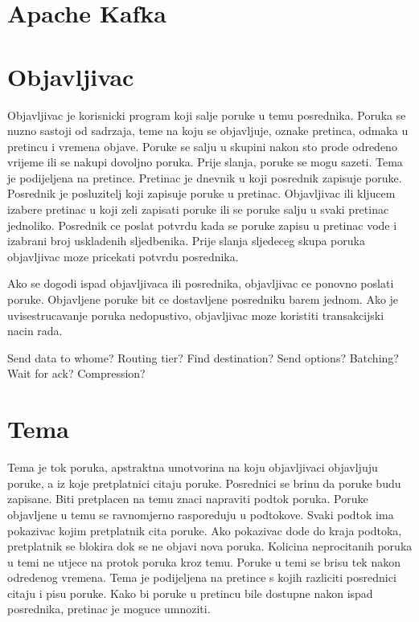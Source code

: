 \documentclass[times, utf8, diplomski, numeric]{fer}
\begin{document}
\chapter{Apache Kafka}



\chapter{Objavljivac}
Objavljivac je korisnicki program koji salje poruke u temu posrednika. Poruka se nuzno sastoji od sadrzaja, teme na koju se objavljuje, oznake pretinca, odmaka u pretincu i vremena objave. Poruke se salju u skupini nakon sto prode odredeno vrijeme ili se nakupi dovoljno poruka. Prije slanja, poruke se mogu sazeti. Tema je podijeljena na pretince. Pretinac je dnevnik u koji posrednik zapisuje poruke. Posrednik je posluzitelj koji zapisuje poruke u pretinac. Objavljivac ili kljucem izabere pretinac u koji zeli zapisati poruke ili se poruke salju u svaki pretinac jednoliko. Posrednik ce poslat potvrdu kada se poruke zapisu u pretinac vode i izabrani broj uskladenih sljedbenika. Prije slanja sljedeceg skupa poruka objavljivac moze pricekati potvrdu posrednika. 

Ako se dogodi ispad objavljivaca ili posrednika, objavljivac ce ponovno poslati poruke. Objavljene poruke bit ce dostavljene posredniku barem jednom. Ako je uvisestrucavanje poruka nedopustivo, objavljivac moze koristiti transakcijski nacin rada. 

Send data to whome?
Routing tier?
Find destination?
Send options?
Batching?
Wait for ack?
Compression?


\chapter{Tema}
Tema je tok poruka, apstraktna umotvorina na koju objavljivaci objavljuju poruke, a iz koje pretplatnici citaju poruke. Posrednici se brinu da poruke budu zapisane. Biti pretplacen na temu znaci napraviti podtok poruka. Poruke objavljene u temu se ravnomjerno rasporeduju u podtokove. Svaki podtok ima pokazivac kojim pretplatnik cita poruke. Ako pokazivac dode do kraja podtoka, pretplatnik se blokira dok se ne objavi nova poruka. Kolicina neprocitanih poruka u temi ne utjece na protok poruka kroz temu. Poruke u temi se brisu tek nakon odredenog vremena. Tema je podijeljena na pretince s kojih razliciti posrednici citaju i pisu poruke. Kako bi poruke u pretincu bile dostupne nakon ispad posrednika, pretinac je moguce umnoziti.
\end{document}
